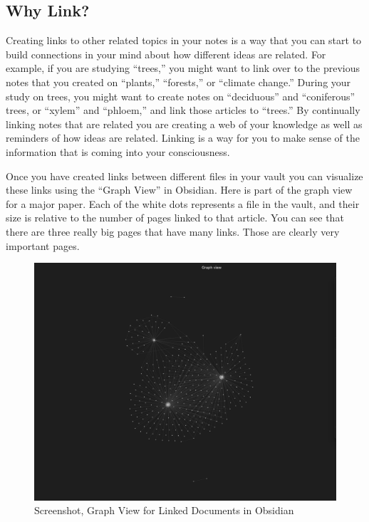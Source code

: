 \documentclass[
  letterpaper,
  DIV=11,
  numbers=noendperiod]{scrreprt}
\begin{document}
\subsection*{Why Link?}\label{why-link}

Creating links to other related topics in your notes is a way that you
can start to build connections in your mind about how different ideas
are related. For example, if you are studying ``trees,'' you might want
to link over to the previous notes that you created on ``plants,''
``forests,'' or ``climate change.'' During your study on trees, you
might want to create notes on ``deciduous'' and ``coniferous'' trees, or
``xylem'' and ``phloem,'' and link those articles to ``trees.'' By
continually linking notes that are related you are creating a web of
your knowledge as well as reminders of how ideas are related. Linking is
a way for you to make sense of the information that is coming into your
consciousness.

Once you have created links between different files in your vault you
can visualize these links using the ``Graph View'' in Obsidian. Here is
part of the graph view for a major paper. Each of the white dots
represents a file in the vault, and their size is relative to the number
of pages linked to that article. You can see that there are three really
big pages that have many links. Those are clearly very important pages.

\begin{figure}

\caption{\label{fig-graph2}Screenshot, Graph View for Linked Documents
in Obsidian}

\includegraphics{assets/u3/graph2.png}

\end{figure}%
\end{document}
